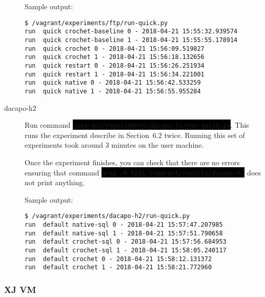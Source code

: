 \documentclass[12pt]{article}
\newcommand{\command}[1]{\colorbox{black}{\texttt{\color{white}#1}}}
\begin{document}
\begin{description}
        Sample output:
        \begin{verbatim}
$ /vagrant/experiments/ftp/run-quick.py
run  quick crochet-baseline 0 - 2018-04-21 15:55:32.939574
run  quick crochet-baseline 1 - 2018-04-21 15:55:55.178914
run  quick crochet 0 - 2018-04-21 15:56:09.519827
run  quick crochet 1 - 2018-04-21 15:56:18.132656
run  quick restart 0 - 2018-04-21 15:56:26.251934
run  quick restart 1 - 2018-04-21 15:56:34.221001
run  quick native 0 - 2018-04-21 15:56:42.533259
run  quick native 1 - 2018-04-21 15:56:55.955284
        \end{verbatim}

    \item[dacapo-h2] Run command
        \command{/vagrant/experiments/dacapo-h2/run-quick.py}.  This runs the
        experiment describe in Section~6.2 twice.  Running this set of
        experiments took around 3 minutes on the user machine.

        Once the experiment finishes, you can check that there are no errors
        ensuring that command \command{grep -R FAIL /vagrant/results/dacapo-h2}
        does not print anything.

Sample output:
\begin{verbatim}
$ /vagrant/experiments/dacapo-h2/run-quick.py
run  default native-sql 0 - 2018-04-21 15:57:47.207985
run  default native-sql 1 - 2018-04-21 15:57:51.790658
run  default crochet-sql 0 - 2018-04-21 15:57:56.684953
run  default crochet-sql 1 - 2018-04-21 15:58:05.240117
run  default crochet 0 - 2018-04-21 15:58:12.131372
run  default crochet 1 - 2018-04-21 15:58:21.772960
\end{verbatim}
\end{description}

\subsubsection{XJ VM}
\end{document}
